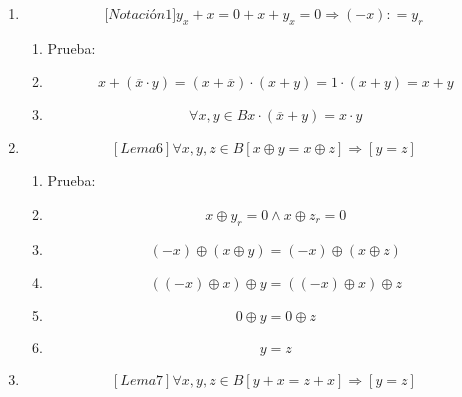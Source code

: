 \begin{enumerate}
\begin{enumerate}
\begin{enumerate}
\begin{enumerate}
        \begin{enumerate}
        \def\labelenumv{\arabic{enumv}.}
        \tightlist
        \item
          Prueba:
        \item
          \[y_{r} \oplus {\left( {x \oplus z_{r}} \right) = y_{r}} \oplus 0\]
        \item
          \[\left( {y_{r} \oplus x} \right) \oplus {z_{r} = y_{r}}\]
        \item
          \[0 \oplus {z_{r} = y_{r}}\]
        \item
          \[z_{r} = y_{r}\]
        \end{enumerate}
      \item
        \[{\lbrack{{Notación}1}\rbrack}{{{y_{x} + x} = {{0 + x} + y_{x}}} = 0}\Rightarrow\left( {- x} \right){: = y_{r}}\]

        \begin{enumerate}
        \def\labelenumv{\arabic{enumv}.}
        \tightlist
        \item
          Prueba:
        \item
          \[{{{x + {({\overline{x} \cdot y})}} = {{({x + \overline{x}})} \cdot {({x + y})}}} = {1 \cdot {({x + y})}}} = {x + y}\]
        \item
          \[\forall x,{y \in B}{{x \cdot {({\overline{x} + y})}} = {x \cdot y}}\]
        \end{enumerate}
      \item
        \[\left\lbrack {{Lema}6} \right\rbrack\forall x,y,{z \in B}\left\lbrack {x \oplus {y = x} \oplus z} \right\rbrack\Rightarrow\left\lbrack {y = z} \right\rbrack\]

        \begin{enumerate}
        \def\labelenumv{\arabic{enumv}.}
        \tightlist
        \item
          Prueba:
        \item
          \[x \oplus {y_{r} = {0 \land x}} \oplus {z_{r} = 0}\]
        \item
          \[{({- x})} \oplus {{({x \oplus y})} = {({- x})}} \oplus {({x \oplus z})}\]
        \item
          \[\left( {{({- x})} \oplus x} \right) \oplus {y = \left( {{({- x})} \oplus x} \right)} \oplus z\]
        \item
          \[0 \oplus {y = 0} \oplus z\]
        \item
          \[y = z\]
        \end{enumerate}
      \item
        \[\left\lbrack {{Lema}7} \right\rbrack\forall x,y,{z \in B}\left\lbrack {{y + x} = {z + x}} \right\rbrack\Rightarrow\left\lbrack {y = z} \right\rbrack\]


\end{enumerate}
\end{enumerate}
\end{enumerate}
\end{enumerate}
